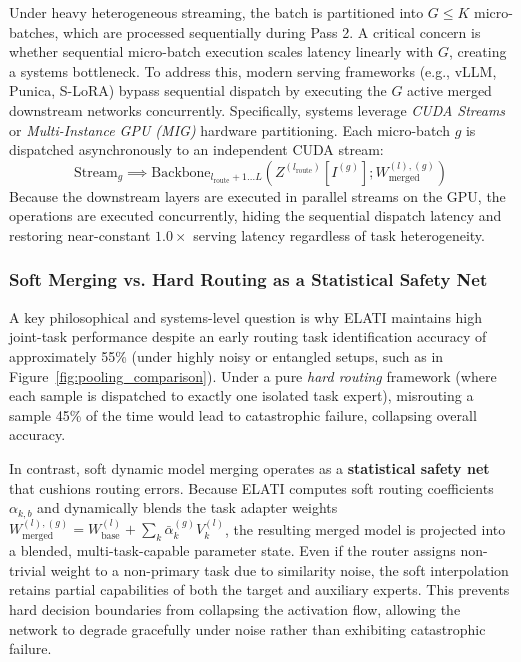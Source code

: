 Under heavy heterogeneous streaming, the batch is partitioned into $G \le K$ micro-batches, which are processed sequentially during Pass 2. A critical concern is whether sequential micro-batch execution scales latency linearly with $G$, creating a systems bottleneck.
To address this, modern serving frameworks (e.g., vLLM, Punica, S-LoRA) bypass sequential dispatch by executing the $G$ active merged downstream networks concurrently.
Specifically, systems leverage \emph{CUDA Streams} or \emph{Multi-Instance GPU (MIG)} hardware partitioning. Each micro-batch $g$ is dispatched asynchronously to an independent CUDA stream:
\begin{equation}
    \text{Stream}_g \implies \text{Backbone}_{l_{\text{route}}+1 \dots L}\left( Z^{(l_{\text{route}})}[I^{(g)}]; W_{\text{merged}}^{(l), (g)} \right)
\end{equation}
Because the downstream layers are executed in parallel streams on the GPU, the operations are executed concurrently, hiding the sequential dispatch latency and restoring near-constant $1.0\times$ serving latency regardless of task heterogeneity.

\subsubsection{Soft Merging vs. Hard Routing as a Statistical Safety Net}
A key philosophical and systems-level question is why ELATI maintains high joint-task performance despite an early routing task identification accuracy of approximately 55\% (under highly noisy or entangled setups, such as in Figure~\ref{fig:pooling_comparison}). Under a pure \emph{hard routing} framework (where each sample is dispatched to exactly one isolated task expert), misrouting a sample 45\% of the time would lead to catastrophic failure, collapsing overall accuracy. 

In contrast, soft dynamic model merging operates as a \textbf{statistical safety net} that cushions routing errors. Because ELATI computes soft routing coefficients $\alpha_{k, b}$ and dynamically blends the task adapter weights $W_{\text{merged}}^{(l), (g)} = W_{\text{base}}^{(l)} + \sum_{k} \bar{\alpha}_k^{(g)} V_k^{(l)}$, the resulting merged model is projected into a blended, multi-task-capable parameter state. Even if the router assigns non-trivial weight to a non-primary task due to similarity noise, the soft interpolation retains partial capabilities of both the target and auxiliary experts. This prevents hard decision boundaries from collapsing the activation flow, allowing the network to degrade gracefully under noise rather than exhibiting catastrophic failure.

